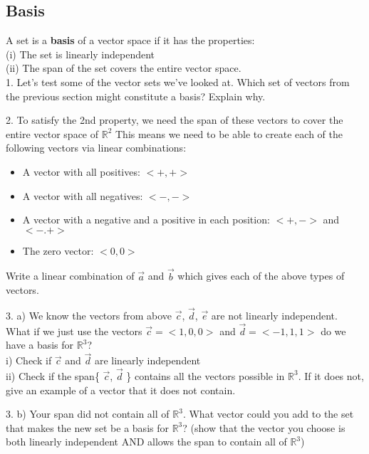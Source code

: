 \documentclass{article}
\begin{document}
\begin{flushleft}
\vspace{1in}

\section*{Basis}
A set is a \textbf{basis} of a vector space if it has the properties:\\
(i) The set is linearly independent\\
(ii) The span of the set covers the entire vector space.\\
\vspace{0.1in}
1. Let's test some of the vector sets we've looked at. Which set of vectors from the previous section might constitute a basis? Explain why.

\vspace{1in}

2. To satisfy the 2nd property, we need the span of these vectors to cover the entire vector space of $\mathbb{R}^2 $ This means we need to be able to create each of the following vectors via linear combinations:\\
\begin{itemize}
\item A vector with all positives: $<+,+>$
\item A vector with all negatives: $<-,->$
\item A vector with a negative and a positive in each position: $<+,->$ and $<-.+>$
\item The zero vector: $<0,0>$
\end{itemize}
Write a linear combination of $\vec{a}$ and $\vec{b}$ which gives each of the above types of vectors.

\vspace{2in}

3. a) We know the vectors from above $\vec{c}$, $\vec{d}$, $\vec{e}$ are not linearly independent. What if we just use the vectors $\vec{c}=<1,0,0>$ and $\vec{d}=<-1,1,1>$ do we have a basis for $\mathbb{R}^3$?\\
i) Check if $\vec{c}$ and $\vec{d}$ are linearly independent\\
ii) Check if the span\{ $\vec{c}$, $\vec{d}$ \} contains all the vectors possible in $\mathbb{R}^3$. If it does not, give an example of a vector that it does not contain.

\vspace{3in}

3. b) Your span did not contain all of $\mathbb{R}^3$. What vector could you add to the set that makes the new set be a basis for $\mathbb{R}^3$? (show that the vector you choose is both linearly independent AND allows the span to contain all of $\mathbb{R}^3$)

\vspace{2in}


\end{flushleft}
\end{document}
